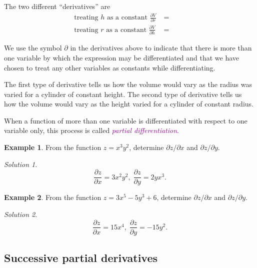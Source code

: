 \documentclass[
  english,
  11pt,
  oneside]{book}
\newcommand{\slide}{}
\theoremstyle{definition}
\theoremstyle{definition}
\newtheorem{example}{Example}[chapter]
\theoremstyle{definition}
\theoremstyle{definition}
\theoremstyle{remark}
\newtheorem*{solution}{Solution}
\begin{document}
\begin{slidesonly}

The two different ``derivatives'' are
\begin{align*}
\text{treating }h\text{ as a constant } \frac{\partial V}{\partial r} &= \phantom{2\pi rh}\\
\text{treating }r\text{ as a constant } \frac{\partial V}{\partial h} &= \phantom{\pi r^2}
\end{align*}
\slide

\end{slidesonly}

We use the symbol \(\partial\) in the derivatives above to indicate that there is more than one variable by which the expression may be differentiated and that we have chosen to treat any other variables as constants while differentiating.

The first type of derivative tells us how the volume would vary as the radius was varied for a cylinder of constant height. The second type of derivative tells us how the volume would vary as the height varied for a cylinder of constant radius.

When a function of more than one variable is differentiated with respect to one variable only, this process is called \textcolor{purple}{\em partial differentiation}.

\slide

\begin{example}
From the function \(z=x^3y^2\), determine \(\partial z/\partial x\) and \(\partial z/\partial y\).
\end{example}

\begin{solution}
\[
\frac{\partial z}{\partial x} = 3x^2y^2,\;\frac{\partial z}{\partial y} = 2yx^3.
\]
\end{solution}

\slide

\begin{example}
From the function \(z=3x^5-5y^3+6\), determine \(\partial z/\partial x\) and \(\partial z/\partial y\).
\end{example}

\begin{solution}
\[
\frac{\partial z}{\partial x} = 15x^4,\;\frac{\partial z}{\partial y} = -15y^2.
\]
\end{solution}

\slide

\subsection{Successive partial derivatives}\label{successive-partial-derivatives}
\end{document}
